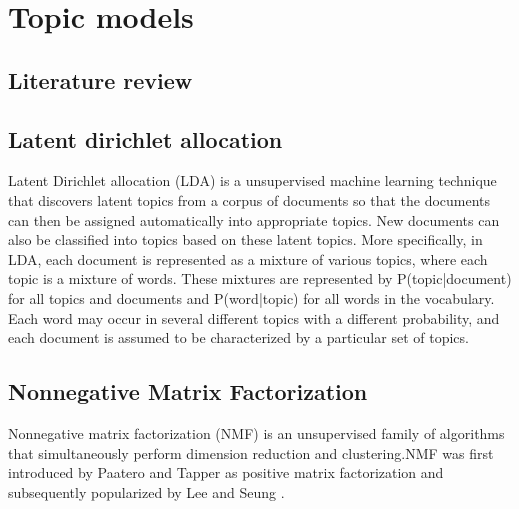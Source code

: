 \section{Topic models}

\subsection{Literature review}


\subsection{Latent dirichlet allocation}

Latent Dirichlet allocation (LDA) \cite{Blei:2003:LDA:944919.944937, heinrich2005parameter, steyvers} is a unsupervised machine learning technique 
that discovers latent topics from a corpus of documents so that the documents 
can then be assigned automatically into appropriate topics. New documents can 
also be classified into topics based on these latent topics. 
More specifically, in LDA, each document is represented as a mixture of various
topics, where each topic is a mixture of words. These mixtures are represented
by P(topic|document) for all topics and documents and P(word|topic) for all words 
in the vocabulary. Each word may occur in several different topics with a different probability, and each document is assumed to be characterized by a particular set of topics.


\subsection{Nonnegative Matrix Factorization}

Nonnegative matrix factorization (NMF) is an unsupervised family of algorithms that simultaneously perform dimension reduction and clustering.NMF was first introduced
by Paatero and Tapper \cite{paa94} as positive matrix factorization and subsequently
popularized by Lee and Seung \cite{lee99}.